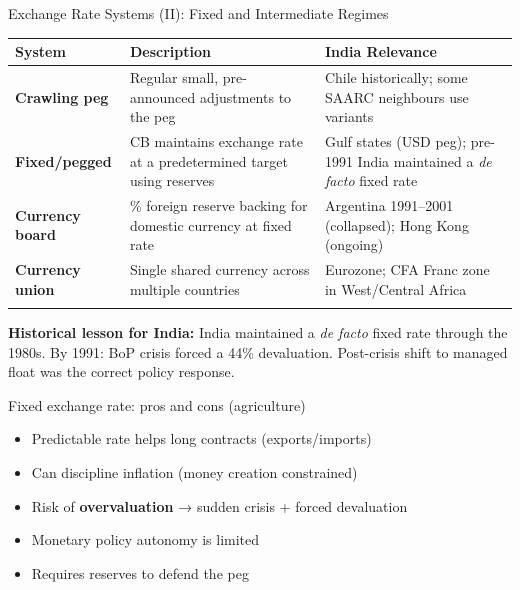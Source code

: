 \documentclass[
  ignorenonframetext,
  aspectratio=169,
]{beamer}
\makeatletter
\providecommand{\tightlist}{%
  \setlength{\itemsep}{0pt}\setlength{\parskip}{0pt}}
\let\quarto@originallabel\label
\DeclareRobustCommand*{\label}[1]{\quarto@originallabel{#1}}
\makeatother
\begin{document}
\begin{frame}{Exchange Rate Systems (II): Fixed and Intermediate
Regimes}
\label{exchange-rate-systems-ii-fixed-and-intermediate-regimes}
\begin{longtable}[]{@{}
  >{\raggedright\arraybackslash}p{}
  >{\raggedright\arraybackslash}p{}
  >{\raggedright\arraybackslash}p{}@{}}
\toprule\noalign{}
\begin{minipage}[b]{\linewidth}\raggedright
System
\end{minipage} & \begin{minipage}[b]{\linewidth}\raggedright
Description
\end{minipage} & \begin{minipage}[b]{\linewidth}\raggedright
India Relevance
\end{minipage} \\
\midrule\noalign{}
\endhead
\textbf{Crawling peg} & Regular small, pre-announced adjustments to the
peg & Chile historically; some SAARC neighbours use variants \\
\textbf{Fixed/pegged} & CB maintains exchange rate at a predetermined
target using reserves & Gulf states (USD peg); pre-1991 India maintained
a \emph{de facto} fixed rate \\
\textbf{Currency board} & 100\% foreign reserve backing for domestic
currency at fixed rate & Argentina 1991--2001 (collapsed); Hong Kong
(ongoing) \\
\textbf{Currency union} & Single shared currency across multiple
countries & Eurozone; CFA Franc zone in West/Central Africa \\
\bottomrule\noalign{}
\end{longtable}

\textbf{Historical lesson for India:} India maintained a \emph{de facto}
fixed rate through the 1980s. By 1991: BoP crisis forced a 44\%
devaluation. Post-crisis shift to managed float was the correct policy
response.
\end{frame}

\begin{frame}{Fixed exchange rate: pros and cons (agriculture)}
\label{fixed-exchange-rate-pros-and-cons-agriculture}
\begin{itemize}
\tightlist
\item
  Predictable rate helps long contracts (exports/imports)
\item
  Can discipline inflation (money creation constrained)
\item
  Risk of \textbf{overvaluation} → sudden crisis + forced devaluation
\item
  Monetary policy autonomy is limited
\item
  Requires reserves to defend the peg
\end{itemize}
\end{frame}
\end{document}
